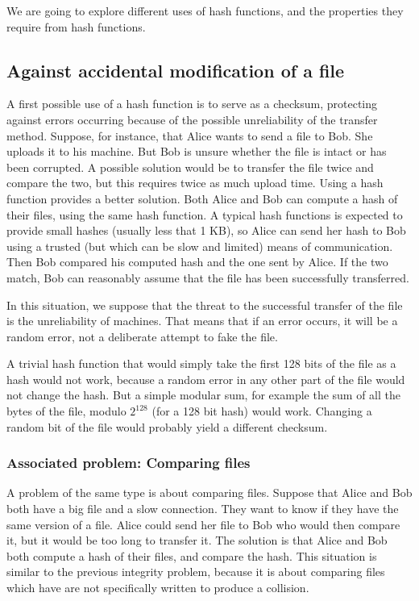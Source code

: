 \documentclass[12pt,a4paper]{article}
\begin{document}
We are going to explore different uses of hash functions, and the properties they require from hash functions.



\subsection{Against accidental modification of a file}

A first possible use of a hash function is to serve as a checksum, protecting against errors occurring because of the possible unreliability of the transfer method. Suppose, for instance, that Alice wants to send a file to Bob. She uploads it to his machine. But Bob is unsure whether the file is intact or has been corrupted. A possible solution would be to transfer the file twice and compare the two, but this requires twice as much upload time. Using a hash function provides a better solution. Both Alice and Bob can compute a hash of their files, using the same hash function. A typical hash functions is expected to provide small hashes (usually less that 1 KB), so Alice can send her hash to Bob using a trusted (but which can be slow and limited) means of communication. Then Bob compared his computed hash and the one sent by Alice. If the two match, Bob can reasonably assume that the file has been successfully transferred.

In this situation, we suppose that the threat to the successful transfer of the file is the unreliability of machines. That means that if an error occurs, it will be a random error, not a deliberate attempt to fake the file.

A trivial hash function that would simply take the first 128 bits of the file as a hash would not work, because a random error in any other part of the file would not change the hash. But a simple modular sum, for example the sum of all the bytes of the file, modulo $2^{128}$ (for a 128 bit hash) would work. Changing a random bit of the file would probably yield a different checksum.

\subsubsection{Associated problem: Comparing files}
A problem of the same type is about comparing files. Suppose that Alice and Bob both have a big file and a slow connection. They want to know if they have the same version of a file. Alice could send her file to Bob who would then compare it, but it would be too long to transfer it. The solution is that Alice and Bob both compute a hash of their files, and compare the hash. This situation is similar to the previous integrity problem, because it is about comparing files which have are not specifically written to produce a collision.
\end{document}
